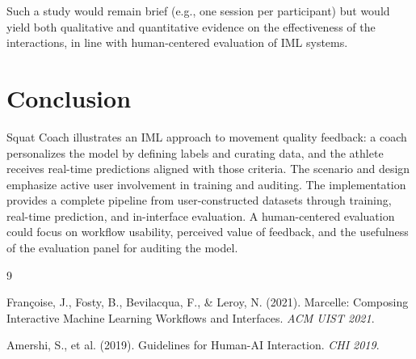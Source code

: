 \documentclass[10pt,twocolumn]{article}
\begin{document}
Such a study would remain brief (e.g., one session per participant) but would yield both qualitative and quantitative evidence on the effectiveness of the interactions, in line with human-centered evaluation of IML systems.

\section{Conclusion}

Squat Coach illustrates an IML approach to movement quality feedback: a coach personalizes the model by defining labels and curating data, and the athlete receives real-time predictions aligned with those criteria. The scenario and design emphasize active user involvement in training and auditing. The implementation provides a complete pipeline from user-constructed datasets through training, real-time prediction, and in-interface evaluation. A human-centered evaluation could focus on workflow usability, perceived value of feedback, and the usefulness of the evaluation panel for auditing the model.

\begin{thebibliography}{9}

Françoise, J., Fosty, B., Bevilacqua, F., \& Leroy, N. (2021). Marcelle: Composing Interactive Machine Learning Workflows and Interfaces. \textit{ACM UIST 2021}.

Amershi, S., et al. (2019). Guidelines for Human-AI Interaction. \textit{CHI 2019}.

\end{thebibliography}
\end{document}

